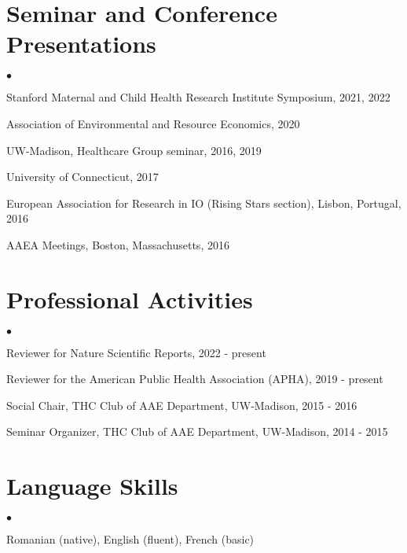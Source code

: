 \documentclass[margin,line]{res}                          %
\newenvironment{list2}{
  \begin{list}{$\bullet$}{%
      \setlength{\itemsep}{0in}
      \setlength{\parsep}{0in} \setlength{\parskip}{0in}
      \setlength{\topsep}{0in} \setlength{\partopsep}{0in} 
      \setlength{\leftmargin}{0.2in}}}{\end{list}}
\begin{document}
\begin{resume}
\section{\sc Seminar and Conference Presentations}
\begin{list2}
\item[] Stanford Maternal and Child Health Research Institute Symposium, 2021, 2022
\item[] Association of Environmental and Resource Economics, 2020
\item[] UW-Madison, Healthcare Group seminar, 2016, 2019
\item[] University of Connecticut, 2017
\item[] European Association for Research in IO (Rising Stars section), Lisbon, Portugal, 2016
\item[] AAEA Meetings, Boston, Massachusetts, 2016
\end{list2}

\section{\sc Professional Activities}
\begin{list2}
\item[] Reviewer for Nature Scientific Reports, 2022 - present
\item[] Reviewer for the American Public Health Association (APHA), 2019 - present
\item[] Social Chair, THC Club of AAE Department, UW-Madison, 2015 - 2016
\item[] Seminar Organizer, THC Club of AAE Department, UW-Madison, 2014 - 2015
\end{list2}


\section{\sc Language Skills}
\begin{list2}
\item[] Romanian (native), English (fluent), French (basic)
\end{list2}


\end{resume}
\end{document}
